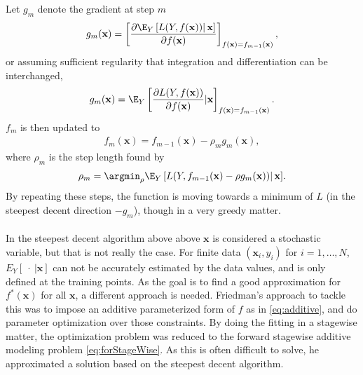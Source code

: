 Let $g_m$ denote the gradient at step $m$
\begin{align}
  g_{m}(\mathbf{x}) = \left[ \frac{\partial \E_{Y} \left[ L(Y, f(\mathbf{x})) \right | \mathbf{x}]}{\partial f(\mathbf{x})}  \right]_{f(\mathbf{x}) = f_{m-1}(\mathbf{x})},
\end{align}
or assuming sufficient regularity that integration and differentiation can be interchanged, 
\begin{align}
  g_{m}(\mathbf{x}) = \E_{Y} \left[ \frac{\partial L(Y, f(\mathbf{x})) }{\partial f(\mathbf{x})}  | \mathbf{x}\right]_{f(\mathbf{x}) = f_{m-1}(\mathbf{x})}.
\end{align}
$f_m$ is then updated to
\begin{align}
  f_m(\mathbf{x}) = f_{m-1}(\mathbf{x}) - \rho_m  g_m(\mathbf{x}),
\end{align}
where $\rho_m$ is the step length found by
\begin{align}
  \rho_m = \argmin_{\rho}  \E_{Y} \left[ L(Y, f_{m-1}(\mathbf{x}) - \rho g_m(\mathbf{x})) \right | \mathbf{x}].
\end{align}
By repeating these steps, the function is moving towards a minimum of $L$ (in the steepest decent direction $-g_m$), though in a very greedy matter. \\
\\
In the steepest decent algorithm above above $\mathbf{x}$ is considered a stochastic variable, but that is not really the case. For finite data $(\mathbf{x}_i, y_i)$ for $i = 1, \ldots, N$, $E_Y \left[\: \cdot \:| \mathbf{x} \right]$ can not be accurately estimated by the data values, and is only defined at the training points. As the goal is to find a good approximation for $f^*(\mathbf{x})$ for all $\mathbf{x}$, a different approach is needed. Friedman's approach to tackle this was to impose an additive parameterized form of $f$ as in \eqref{eq:additive}, and do parameter optimization over those constraints. By doing the fitting in a stagewise matter, the optimization problem was reduced to the forward stagewise additive modeling problem \eqref{eq:forStageWise}. As this is often difficult to solve, he approximated a solution based on the steepest decent algorithm.

